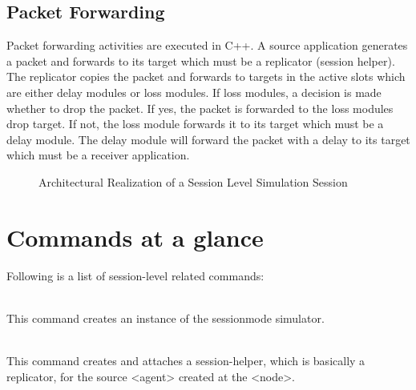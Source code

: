 \subsection{Packet Forwarding}
\label{sec:session-pktforward}
Packet forwarding activities are executed in C++.  A source application 
generates a packet and forwards to its target which must be a replicator 
(session helper).  The replicator copies the packet and forwards 
to targets in the active slots which are either delay modules or loss modules. If loss modules, a decision is made whether to drop the packet.
If yes, the packet is forwarded to the loss modules drop target.  If not,
the loss module forwards it to its target which must be a delay module.
The delay module will forward the packet with a delay to its target which
must be a receiver application.
\begin{figure}[tb]
  \caption{Architectural Realization of a Session Level Simulation Session}
  \label{fig:session}
\end{figure}


\section{Commands at a glance}
\label{sec:sessioncommand}

Following is a list of session-level related commands:
\begin{flushleft}
\\
This command creates an instance of the sessionmode simulator.


\\
This command creates and attaches a session-helper, which is basically a
replicator, for the source <agent> created at the <node>.

\end{flushleft} 

\endinput

### Local Variables:
### mode: latex
### comment-column: 60
### backup-by-copying-when-linked: t
### file-precious-flag: nil
### End:
